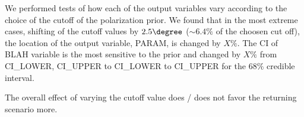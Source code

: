 We performed tests of how each of the output variables vary according to the
choice of the cutoff of the polarization prior.
We found that in the most extreme cases, shifting of the cutoff values by
$2.5\degree$ ($\sim 6.4\%$ of the choosen cut off), the location of the output
variable, PARAM, is changed by $X\%$. The CI of BLAH variable is the most
sensitive to the prior and changed by $X\%$ from CI_LOWER, CI_UPPER to
CI_LOWER to CI_UPPER for the $68\%$ credible interval. 

The overall effect of varying the cutoff value does / does not favor the
returning scenario more. 






